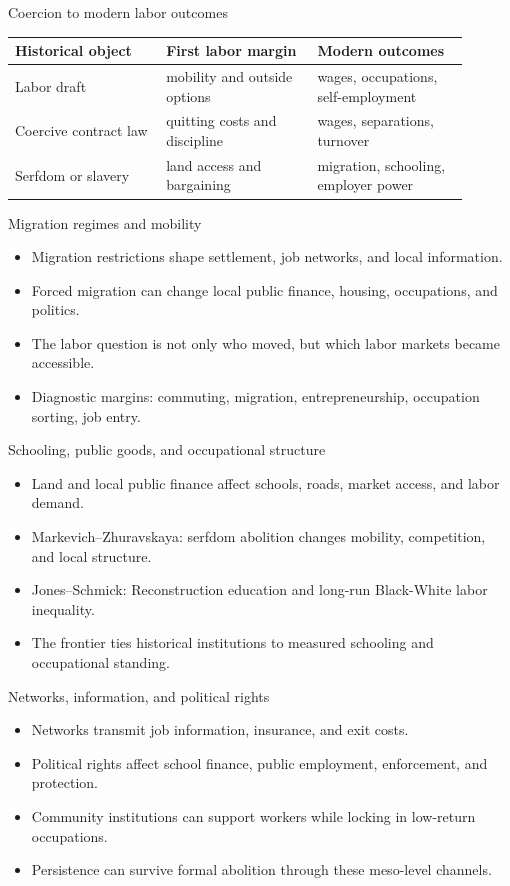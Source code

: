 \documentclass[aspectratio=169,11pt]{beamer}
\begin{document}
\begin{frame}{Coercion to modern labor outcomes}
\small
\begin{tabular}{p{0.30\linewidth} p{0.30\linewidth} p{0.30\linewidth}}
\toprule
Historical object & First labor margin & Modern outcomes \\
\midrule
Labor draft & mobility and outside options & wages, occupations, self-employment \\
Coercive contract law & quitting costs and discipline & wages, separations, turnover \\
Serfdom or slavery & land access and bargaining & migration, schooling, employer power \\
\bottomrule
\end{tabular}
\end{frame}

\begin{frame}{Migration regimes and mobility}
\begin{itemize}
    \item Migration restrictions shape settlement, job networks, and local information.
    \item Forced migration can change local public finance, housing, occupations, and politics.
    \item The labor question is not only who moved, but which labor markets became accessible.
    \item Diagnostic margins: commuting, migration, entrepreneurship, occupation sorting, job entry.
\end{itemize}
\end{frame}

\begin{frame}{Schooling, public goods, and occupational structure}
\begin{itemize}
    \item Land and local public finance affect schools, roads, market access, and labor demand.
    \item Markevich--Zhuravskaya: serfdom abolition changes mobility, competition, and local structure.
    \item Jones--Schmick: Reconstruction education and long-run Black-White labor inequality.
    \item The frontier ties historical institutions to measured schooling and occupational standing.
\end{itemize}
\end{frame}

\begin{frame}{Networks, information, and political rights}
\begin{itemize}
    \item Networks transmit job information, insurance, and exit costs.
    \item Political rights affect school finance, public employment, enforcement, and protection.
    \item Community institutions can support workers while locking in low-return occupations.
    \item Persistence can survive formal abolition through these meso-level channels.
\end{itemize}
\end{frame}
\end{document}
